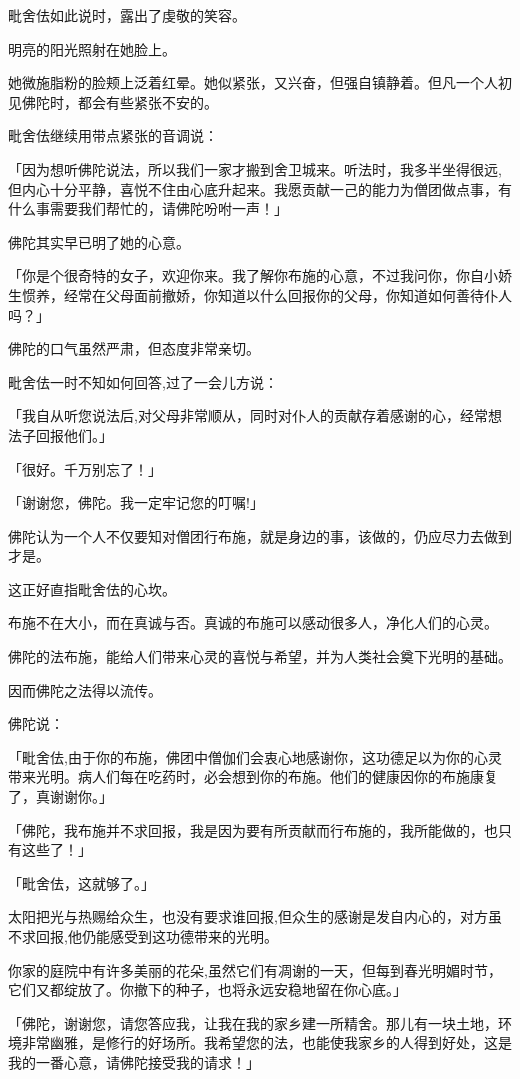 \documentclass[twoside,openany]{book}
\begin{document}
毗舍佉如此说时，露出了虔敬的笑容。

明亮的阳光照射在她脸上。

她微施脂粉的脸颊上泛着红晕。她似紧张，又兴奋，但强自镇静着。但凡一个人初见佛陀时，都会有些紧张不安的。

毗舍佉继续用带点紧张的音调说：

「因为想听佛陀说法，所以我们一家才搬到舍卫城来。听法时，我多半坐得很远,但内心十分平静，喜悦不住由心底升起来。我愿贡献一己的能力为僧团做点事，有什么事需要我们帮忙的，请佛陀吩咐一声！」

佛陀其实早已明了她的心意。

「你是个很奇特的女子，欢迎你来。我了解你布施的心意，不过我问你，你自小娇生惯养，经常在父母面前撤娇，你知道以什么回报你的父母，你知道如何善待仆人吗？」

佛陀的口气虽然严肃，但态度非常亲切。

毗舍佉一时不知如何回答,过了一会儿方说：

「我自从听您说法后,对父母非常顺从，同时对仆人的贡献存着感谢的心，经常想法子回报他们。」

「很好。千万别忘了！」

「谢谢您，佛陀。我一定牢记您的叮嘱!」

佛陀认为一个人不仅要知对僧团行布施，就是身边的事，该做的，仍应尽力去做到才是。

这正好直指毗舍佉的心坎。

布施不在大小，而在真诚与否。真诚的布施可以感动很多人，净化人们的心灵。

佛陀的法布施，能给人们带来心灵的喜悦与希望，并为人类社会奠下光明的基础。

因而佛陀之法得以流传。

佛陀说：

「毗舍佉,由于你的布施，佛团中僧伽们会衷心地感谢你，这功德足以为你的心灵带来光明。病人们每在吃药时，必会想到你的布施。他们的健康因你的布施康复了，真谢谢你。」

「佛陀，我布施并不求回报，我是因为要有所贡献而行布施的，我所能做的，也只有这些了！」

「毗舍佉，这就够了。」

太阳把光与热赐给众生，也没有要求谁回报,但众生的感谢是发自内心的，对方虽不求回报,他仍能感受到这功德带来的光明。

你家的庭院中有许多美丽的花朵,虽然它们有凋谢的一天，但每到春光明媚时节，它们又都绽放了。你撤下的种子，也将永远安稳地留在你心底。」

「佛陀，谢谢您，请您答应我，让我在我的家乡建一所精舍。那儿有一块土地，环境非常幽雅，是修行的好场所。我希望您的法，也能使我家乡的人得到好处，这是我的一番心意，请佛陀接受我的请求！」
\end{document}

